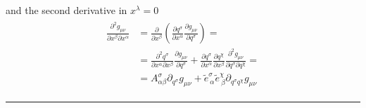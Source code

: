 \documentclass[letterpaper,10pt,english]{jupyterBook}
\begin{document}
\sphinxAtStartPar
and the second derivative in \(x^\lambda = 0\)
\begin{equation*}
\begin{split}\begin{aligned}
  \frac{\partial^2 g_{\mu \nu}}{\partial x^\beta \partial x^\alpha} 
  & = \frac{\partial}{\partial x^{\beta}} \left( \frac{\partial q^{\sigma}}{\partial x^{\alpha}} \frac{\partial g_{\mu \nu}}{\partial q^{\sigma}} \right) = \\
  & = \frac{\partial^2 q^{\sigma}}{\partial x^\alpha \partial x^\beta} \frac{\partial g_{\mu \nu}}{\partial q^{\sigma}} + \frac{\partial q^{\sigma}}{\partial x^\alpha} \frac{\partial q^{\chi}}{\partial x^\beta} \frac{\partial^2 g_{\mu \nu}}{\partial q^\sigma \partial q^\chi} = \\
  & = A^{\sigma}_{\alpha \beta} \partial_{q^\sigma} g_{\mu \nu} + \widetilde{e}^{\sigma}_{\ \alpha} \widetilde{e}^{\chi}_{\ \beta} \partial_{q^\sigma q^\chi} g_{\mu \nu} 
\end{aligned}\end{split}
\end{equation*}

\bigskip\hrule\bigskip
\end{document}
